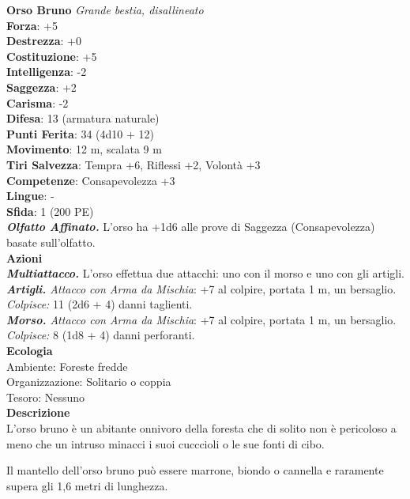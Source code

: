 \begin{multicols}{2}
\medskip\textbf{Orso Bruno}
\emph{Grande bestia, disallineato}\\
\textbf{Forza}: +5\\
\textbf{Destrezza}: +0\\
\textbf{Costituzione}: +5\\
\textbf{Intelligenza}: -2\\
\textbf{Saggezza}: +2\\
\textbf{Carisma}: -2\\
\textbf{Difesa}: 13 (armatura naturale)\\
\textbf{Punti Ferita}: 34 (4d10 + 12)\\
\textbf{Movimento}: 12 m, scalata 9 m\\
\textbf{Tiri Salvezza}: Tempra +6, Riflessi +2, Volontà +3 \\
\textbf{Competenze}: Consapevolezza +3\\
\textbf{Lingue}: -\\
\textbf{Sfida}: 1 (200 PE)\smallskip\\
\emph{\textbf{Olfatto Affinato.}} L'orso ha +1d6 alle prove di Saggezza (Consapevolezza) basate sull'olfatto.\\
\smallskip\textbf{Azioni}\\
\emph{\textbf{Multiattacco.}} L'orso effettua due attacchi: uno con il morso e uno con gli artigli.\\
\emph{\textbf{Artigli.} Attacco con Arma da Mischia}: +7 al colpire, portata 1 m, un bersaglio.\\
\emph{Colpisce:} 11 (2d6 + 4) danni taglienti.\\
\emph{\textbf{Morso.} Attacco con Arma da Mischia}: +7 al colpire, portata 1 m, un bersaglio.\\
\emph{Colpisce:} 8 (1d8 + 4) danni perforanti.\\
\textbf{Ecologia}\\
Ambiente: Foreste fredde\\
Organizzazione: Solitario o coppia\\
Tesoro: Nessuno\\
\textbf{Descrizione}\\

L'orso bruno è un abitante onnivoro della foresta che di solito non è pericoloso a meno che un intruso minacci i suoi cucccioli o le sue fonti di cibo.

Il mantello dell'orso bruno può essere marrone, biondo o cannella e raramente supera gli 1,6 metri di lunghezza. 


\end{multicols}

